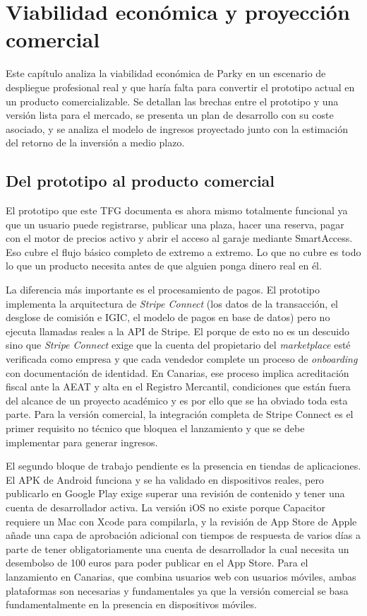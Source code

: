 \chapter{Viabilidad económica y proyección comercial}
\label{ch:viabilidad_economica}

Este capítulo analiza la viabilidad económica de Parky en un escenario de despliegue profesional real y que haría falta para convertir el prototipo actual en un producto comercializable. Se detallan las brechas entre el prototipo y una versión lista para el mercado, se presenta un plan de desarrollo con su coste asociado, y se analiza el modelo de ingresos proyectado junto con la estimación del retorno de la inversión a medio plazo.

\section{Del prototipo al producto comercial}
\label{sec:prototipo_a_comercial}

El prototipo que este TFG documenta es ahora mismo totalmente funcional ya que un usuario puede registrarse, publicar una plaza, hacer una reserva, pagar con el motor de precios activo y abrir el acceso al garaje mediante SmartAccess. Eso cubre el flujo básico completo de extremo a extremo. Lo que no cubre es todo lo que un producto necesita antes de que alguien ponga dinero real en él.

La diferencia más importante es el procesamiento de pagos. El prototipo implementa la arquitectura de \textit{Stripe Connect} (los datos de la transacción, el desglose de comisión e IGIC, el modelo de pagos en base de datos) pero no ejecuta llamadas reales a la API de Stripe. El porque de esto no es un descuido sino que \textit{Stripe Connect} exige que la cuenta del propietario del \textit{marketplace} esté verificada como empresa y que cada vendedor complete un proceso de \textit{onboarding} con documentación de identidad. En Canarias, ese proceso implica acreditación fiscal ante la AEAT y alta en el Registro Mercantil, condiciones que están fuera del alcance de un proyecto académico y es por ello que se ha obviado toda esta parte. Para la versión comercial, la integración completa de Stripe Connect es el primer requisito no técnico que bloquea el lanzamiento y que se debe implementar para generar ingresos.

El segundo bloque de trabajo pendiente es la presencia en tiendas de aplicaciones. El APK de Android funciona y se ha validado en dispositivos reales, pero publicarlo en Google Play exige superar una revisión de contenido y tener una cuenta de desarrollador activa. La versión iOS no existe porque Capacitor requiere un Mac con Xcode para compilarla, y la revisión de App Store de Apple añade una capa de aprobación adicional con tiempos de respuesta de varios días a parte de tener obligatoriamente una cuenta de desarrollador la cual necesita un desembolso de 100 euros para poder publicar en el App Store. Para el lanzamiento en Canarias, que combina usuarios web con usuarios móviles, ambas plataformas son necesarias y fundamentales ya que la versión comercial se basa fundamentalmente en la presencia en dispositivos móviles.

